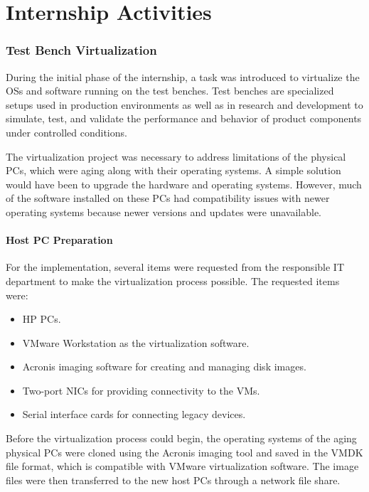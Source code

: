 \chapter{Internship Activities}
\label{chap:internship-activities}

\subsection{Test Bench Virtualization}

During the initial phase of the internship, a task was introduced to virtualize the \acp{OS} and software running on the test benches. Test benches are specialized setups used in production environments as well as in research and development to simulate, test, and validate the performance and behavior of product components under controlled conditions.

The virtualization project was necessary to address limitations of the physical \acp{PC}, which were aging along with their operating systems. A simple solution would have been to upgrade the hardware and operating systems. However, much of the software installed on these \acp{PC} had compatibility issues with newer operating systems because newer versions and updates were unavailable.

\subsubsection{Host PC Preparation}

For the implementation, several items were requested from the responsible \ac{IT} department to make the virtualization process possible. The requested items were:

\begin{itemize}
    \item HP \acp{PC}.
    \item VMware Workstation as the virtualization software.
    \item Acronis imaging software for creating and managing disk images.
    \item Two-port \acp{NIC} for providing connectivity to the \acp{VM}.
    \item Serial interface cards for connecting legacy devices.
\end{itemize}

Before the virtualization process could begin, the operating systems of the aging physical \acp{PC} were cloned using the Acronis imaging tool and saved in the \ac{VMDK} file format, which is compatible with VMware virtualization software. The image files were then transferred to the new host \acp{PC} through a network file share.

